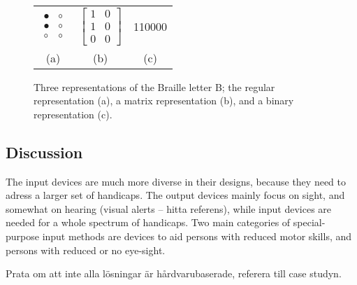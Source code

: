 \begin{figure}[h!]

	\centering

\begin{tabular}{c c c}

$
\begin{array}{cc}
\bullet & \circ \\
\bullet & \circ \\
\circ & \circ \end{array}
$

&

$
\left[ \begin{array}{cc}
1 & 0 \\
1 & 0 \\
0 & 0 \end{array} \right]
$ 

&

110000 \\

(a) & (b) & (c)

\end{tabular}


	\caption{Three representations of the Braille letter B; the regular representation (a), a matrix representation (b), and a binary representation (c).}

\end{figure}

\subsection{Discussion}
The input devices are much more diverse in their designs, because they need to adress a larger set of handicaps. The output devices mainly focus on sight, and somewhat on hearing (visual alerts -- hitta referens), while input devices are needed for a whole spectrum of handicaps. Two main categories of special-purpose input methods are devices to aid persons with reduced motor skills, and persons with reduced or no eye-sight. 

Prata om att inte alla lösningar är hårdvarubaserade, referera till case studyn.

